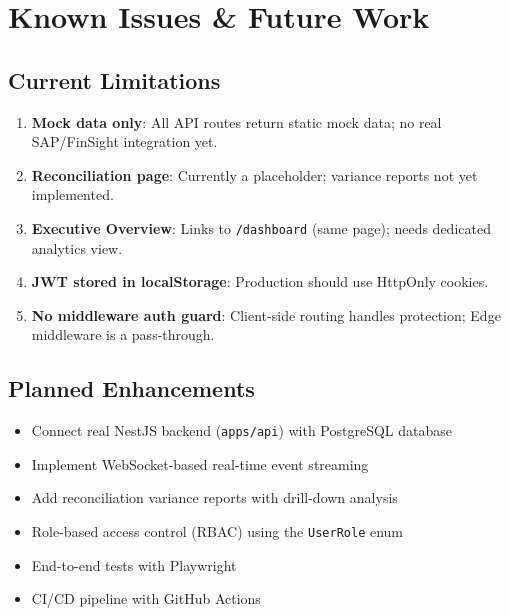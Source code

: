 \documentclass[12pt,a4paper]{article}
\begin{document}
\section{Known Issues \& Future Work}

\subsection{Current Limitations}

\begin{enumerate}[leftmargin=2em]
  \item \textbf{Mock data only}: All API routes return static mock data; no real SAP/FinSight integration yet.
  \item \textbf{Reconciliation page}: Currently a placeholder; variance reports not yet implemented.
  \item \textbf{Executive Overview}: Links to \texttt{/dashboard} (same page); needs dedicated analytics view.
  \item \textbf{JWT stored in localStorage}: Production should use HttpOnly cookies.
  \item \textbf{No middleware auth guard}: Client-side routing handles protection; Edge middleware is a pass-through.
\end{enumerate}

\subsection{Planned Enhancements}

\begin{itemize}[leftmargin=2em]
  \item Connect real NestJS backend (\texttt{apps/api}) with PostgreSQL database
  \item Implement WebSocket-based real-time event streaming
  \item Add reconciliation variance reports with drill-down analysis
  \item Role-based access control (RBAC) using the \texttt{UserRole} enum
  \item End-to-end tests with Playwright
  \item CI/CD pipeline with GitHub Actions
\end{itemize}

\end{document}
